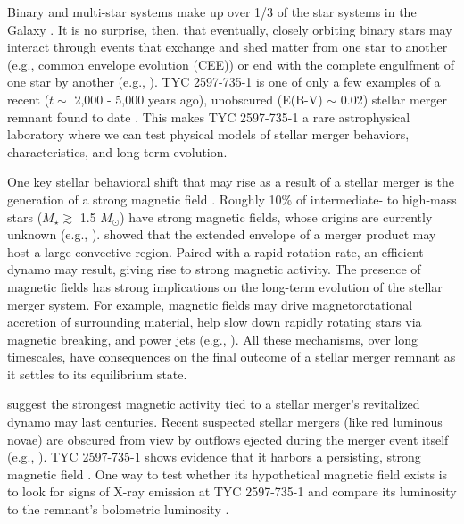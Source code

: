 \documentclass[linenumbers]{aastex631}
\begin{document}
Binary and multi-star systems make up over 1/3 of the star systems in the Galaxy \citep{Raghavan+2010}. It is no surprise, then, that eventually, closely orbiting binary stars may interact through events that exchange and shed matter from one star to another (e.g., common envelope evolution (CEE)) or end with the complete engulfment of one star by another (e.g., \citealt{Ivanova+2013}). TYC 2597-735-1 is one of only a few examples of a recent ($t \sim$ 2,000 - 5,000 years ago), unobscured (E(B-V) $\sim$ 0.02) stellar merger remnant found to date \citep{2020Natur.587..387H}. This makes TYC 2597-735-1 a rare astrophysical laboratory where we can test physical models of stellar merger behaviors, characteristics, and long-term evolution. 

One key stellar behavioral shift that may rise as a result of a stellar merger is the generation of a strong magnetic field \citep{Schneider+2016}. Roughly 10\% of intermediate- to high-mass stars ($M_{\star} \gtrsim$ 1.5 $M_{\odot}$) have strong magnetic fields, whose origins are currently unknown (e.g., \citealt{Donati+2009,Fossati+2015,Grunhut+2017}). \citet{Soker&Tylenda2007} showed that the extended envelope of a merger product may host a large convective region. Paired with a rapid rotation rate, an efficient dynamo may result, giving rise to strong magnetic activity. The presence of magnetic fields has strong implications on the long-term evolution of the stellar merger system. For example, magnetic fields may drive magnetorotational accretion of surrounding material, help slow down rapidly rotating stars via magnetic breaking, and power jets (e.g., \citealt{Schneider+2020}). All these mechanisms, over long timescales, have consequences on the final outcome of a stellar merger remnant as it settles to its equilibrium state.

\citet{Soker&Tylenda2007} suggest the strongest magnetic activity tied to a stellar merger's revitalized dynamo may last centuries. Recent suspected stellar mergers (like red luminous novae) are obscured from view by outflows ejected during the merger event itself (e.g., \citealt{Bond+2003, Tylenda+2016}). TYC 2597-735-1 shows evidence that it harbors a persisting, strong magnetic field \citep[e.g., H$\alpha$ emission and variability, radial velocity shifts strongly correlated with the Ca II IRT stellar atmospheric features][]{2020Natur.587..387H}. One way to test whether its hypothetical magnetic field exists is to look for signs of X-ray emission at TYC 2597-735-1 and compare its luminosity to the remnant's bolometric luminosity \citep{Soker&Tylenda2007}.
\end{document}
